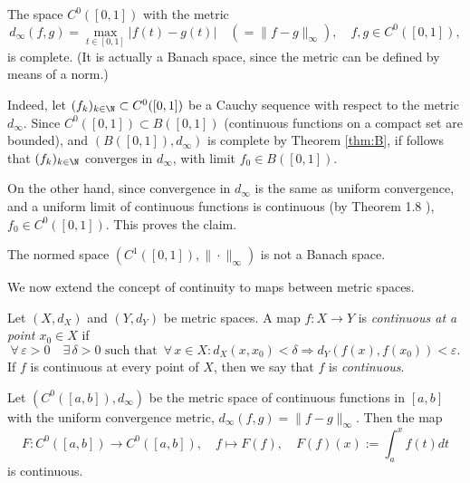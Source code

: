 \np

\begin{example}
The space $C^0([0,1])$ with the metric
\[
d_\infty(f,g) = \max_{t \in [0,1]} |f(t) - g(t)| \quad (=\|f-g\|_{\infty}), \quad f,g \in C^0([0,1]),
\]%
is complete. (It is actually a Banach space, since the metric can be defined by means of a norm.)

\medskip

Indeed, let $(f_k)_{k \in \N} \subset C^0([0,1])$ be a Cauchy sequence with respect to the metric $d_\infty$. Since 
$C^0([0,1]) \subset B([0,1])$ (continuous functions on a compact set are bounded), and $(B([0,1]), d_\infty)$ 
is complete by Theorem \ref{thm:B}, if follows that $(f_k)_{k \in \N}$ converges in $d_\infty$, with limit $f_0 \in B([0,1])$. 

On the other hand, since convergence in $d_\infty$ is the same as uniform convergence, and a uniform limit of 
continuous functions is continuous (by 
Theorem 1.8%
), $f_0 \in C^0([0,1])$. This proves the claim.

\end{example}


%
%

\bis

\begin{example}
The normed space $(C^1([0,1]),\|\cdot\|_{\infty})$ is not a Banach space.
\end{example}



We now extend the concept of continuity to maps between metric spaces.

\begin{definition}
Let $(X,d_X)$ and $(Y,d_Y)$ be metric spaces. A map $f : X \to Y$
is \emph{continuous at a point $x_0 \in X$} if
\[
\forall\, \varepsilon > 0 \quad \exists\, \delta > 0 \,\, \textrm{such that } \, \forall \, x \in X: d_X(x,x_0) < \delta \Rightarrow d_Y(f(x),f(x_0)) < \varepsilon.
\]
If $f$ is continuous at every point of $X$, then we say that $f$ is \emph{continuous}.
\end{definition}

\bis

\begin{example}\label{continuous:primitive}
Let $(C^0([a,b]),d_\infty)$ be the metric space of continuous functions in $[a,b]$ with the uniform convergence metric, $d_\infty(f,g)=\|f-g\|_{\infty}$. Then the map 
$$
F: C^0([a,b]) \to C^0([a,b]), \quad f\mapsto F(f),\quad  F(f)(x):= \int_a^x f(t) dt
$$
is continuous.
\end{example}

